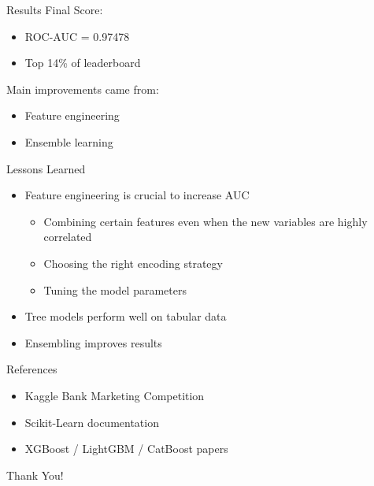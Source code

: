 \documentclass[slidescentered]{beamer}
\begin{document}
\begin{frame}{Results}
Final Score:
\begin{itemize}
\item ROC-AUC = 0.97478
\item Top 14\% of leaderboard
\end{itemize}

Main improvements came from:
\begin{itemize}
\item Feature engineering
\item Ensemble learning
\end{itemize}
\end{frame}

\begin{frame}{Lessons Learned}
\begin{itemize}
\item Feature engineering is crucial to increase AUC
\begin{itemize}
    \item Combining certain features even when the new variables are highly correlated
    \item Choosing the right encoding strategy 
    \item Tuning the model parameters
\end{itemize}
\item Tree models perform well on tabular data
\item Ensembling improves results
\end{itemize}
\end{frame}

\begin{frame}{References}
\begin{itemize}
\item Kaggle Bank Marketing Competition
\item Scikit-Learn documentation
\item XGBoost / LightGBM / CatBoost papers
\end{itemize}
\end{frame}

\begin{frame}
\centering
\Huge Thank You!
\end{frame}
\end{document}
